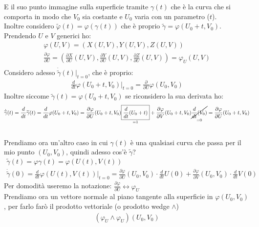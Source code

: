 \documentclass[a4paper, oneside]{article}
\begin{document}
E il suo punto immagine sulla superficie tramite $\gamma(t)$ che è la curva che si comporta in modo che $V_0$ sia costante e $U_0$ varia con un parametro ($t$).\\
Inoltre considero $\widetilde{\varphi}(t) = \varphi(\gamma(t))$ che è proprio $\widetilde{\gamma} = \varphi(U_0 + t, V_0)$. Prendendo $U$ e $V$ generici ho:
\begin{gather*}
  \varphi(U,V) = \left( X(U,V), Y(U,V), Z(U,V) \right)\\
  \frac{\partial \varphi}{\partial U} = \left( \frac{\partial X}{\partial U}(U,V), \frac{\partial Y}{\partial U}(U,V), \frac{\partial Z}{\partial U}(U,V) \right) = \varphi_U (U,V)\\ 
\end{gather*}
Considero adesso $\dot{\widetilde{\gamma}}(t)|_{t=0}$, che è proprio:
\begin{gather*}
  \frac{d}{dt} \varphi(U_0 + t, V_0) |_{t=0} = \frac{\partial}{\partial U}\varphi(U_0,V_0)
\end{gather*}
Inoltre siccome $\widetilde{\gamma}(t) = \varphi(U_0 + t, V_0)$ se riconsidero la sua derivata ho:
\begin{gather*}
  \dot{\widetilde{\gamma}}(t) = \frac{d}{dt} \widetilde{\gamma}(t) = \frac{d}{dt} \varphi(U_0 + t, V_0) = \frac{\partial \varphi}{\partial U}(U_0 + t, V_0) \underset{= 1}{\boxed{\frac{d}{dt}(U_0 + t)}} + \frac{\partial \varphi}{\partial V}(U_0 + t, V_0) \underset{= 0}{\cancel{\frac{d}{dt}(V_0)}} = \frac{\partial \varphi}{\partial U} (U_0 + t,V_0)
\end{gather*}
\hfill\\
Prendiamo ora un'altro caso in cui $\gamma(t)$ è una qualsiasi curva che passa per il mio punto $(U_0, V_0)$, quindi adesso cos'è $\widetilde{\gamma}$?
\begin{gather*}
  \widetilde{\gamma}(t) = \varphi  \gamma(t) = \varphi(U(t), V(t))\\
  \dot{\widetilde{\gamma}}(0) = \frac{d}{dt} \varphi(U(t), V(t)) |_{t=0} = \frac{\partial \varphi}{\partial U}(U_0, V_0) \cdot \frac{d}{dt}U(0) + \frac{\partial \varphi}{\partial V}(U_0, V_0) \cdot \frac{d}{dt}V(0)
\end{gather*}
Per domodità useremo la notazione: $\frac{\partial \varphi}{\partial U} \leftrightarrow \varphi_U$\\
Prendiamo ora un vettore normale al piano tangente alla superficie in $\varphi(U_0, V_0)$, per farlo farò il prodotto vettoriale (o prodotto wedge $\land$)
\begin{gather*}
  (\varphi_U \land \varphi_U) (U_0, V_0)
\end{gather*}
\end{document}
